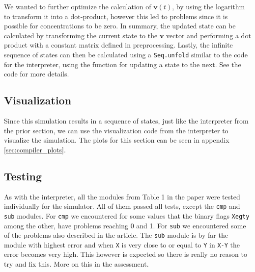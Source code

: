 We wanted to further optimize the calculation of \(\mathbf{v}(t)\), by using the logarithm to transform it into a dot-product, however this led to problems since it is possible for concentrations to be zero. In summary, the updated state can be calculated by transforming the current state to the $\mathbf{v}$ vector and performing a dot product with a constant matrix defined in preprocessing. Lastly, the infinite sequence of states can then be calculated using a \texttt{Seq.unfold} similar to the code for the interpreter, using the function for updating a state to the next. See the code for more details. 

\subsection{Visualization}
Since this simulation results in a sequence of states, just like the interpreter from the prior section, we can use the visualization code from the interpreter to visualize the simulation. The plots for this section can be seen in appendix \ref{sec:compiler_plots}.

\subsection{Testing}
As with the interpreter, all the modules from Table 1 in the paper were tested individually for the simulator. All of them passed all tests, except the \texttt{cmp} and \texttt{sub} modules. For \texttt{cmp} we encountered for some values that the binary flags \texttt{Xegty} among the other, have problems reaching 0 and 1. For \texttt{sub} we encountered some of the problems also described in the article. The \texttt{sub} module is by far the module with highest error and when \texttt{X} is very close to or equal to \texttt{Y} in \texttt{X-Y} the error becomes very high. This however is expected so there is really no reason to try and fix this. More on this in the assessment.

